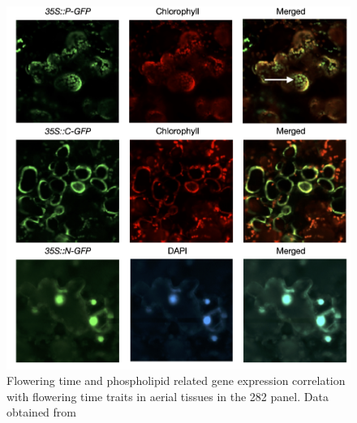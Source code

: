\documentclass[9pt,twocolumn,twoside,lineno]{BioRxiv}
\begin{document}
\begin{figure}[t]
\begin{center}
\includegraphics[width=0.8\paperwidth]{Sup_Figures/Sup_Fig_7.png}
\caption{Flowering time and phospholipid related gene expression correlation with flowering time traits in aerial tissues in the 282 panel. 
Data obtained from \cite{Kremling2018-gn}
}
\label{SupFig7}
\end{center}
\end{figure} 
\end{document}
